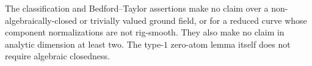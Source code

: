 \begin{remark}
\label{rem:p21p3-curve-scope}
The classification and Bedford--Taylor assertions make no claim over a
non-algebraically-closed or trivially valued ground field, or for a reduced
curve whose component normalizations are not rig-smooth.  They also make
no claim in analytic dimension at least two.  The type-$1$ zero-atom lemma
itself does not require algebraic closedness.
\end{remark}
